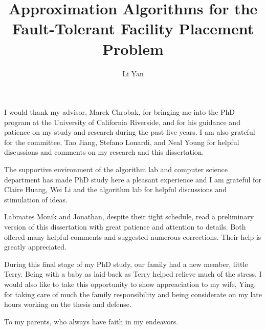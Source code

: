\documentclass[oneside,final]{ucr}
\begin{document}

\title{Approximation Algorithms for the Fault-Tolerant Facility Placement Problem}
\author{Li Yan}

\maketitle
\copyrightpage{}
\approvalpage{}


\begin{frontmatter}

\begin{acknowledgements}
  I would thank my advisor, Marek Chrobak, for bringing me
  into the PhD program at the University of California
  Riverside, and for his guidance and patience on my study
  and research during the past five years. I am also
  grateful for the committee, Tao Jiang, Stefano Lonardi,
  and Neal Young for helpful discussions and comments on my
  research and this dissertation.

  The supportive environment of the algorithm lab and
  computer science department has made PhD study here a
  pleasant experience and I am grateful for Claire Huang,
  Wei Li and the algorithm lab for helpful discussions and
  stimulation of ideas.

  Labmates Monik and Jonathan, despite their tight schedule,
  read a preliminary version of this dissertation with great
  patience and attention to details. Both offered many
  helpful comments and suggested numerous corrections. Their
  help is greatly appreciated.

  During this final stage of my PhD study, our family had a
  new member, little Terry. Being with a baby as laid-back
  as Terry helped relieve much of the stress. I would also
  like to take this opportunity to show appreaciation to my
  wife, Ying, for taking care of much the family
  responsibility and being considerate on my late hours
  working on the thesis and defense.
\end{acknowledgements}

\begin{dedication}
\null\vfil
{\large
\begin{center}
  To my parents, who always have faith in my endeavors.
\end{center}}
\vfil\null
\end{dedication}


\end{frontmatter}
\end{document}
